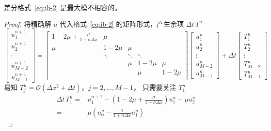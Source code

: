\begin{example}
    差分格式~\eqref{eq:ib-2} 是最大模不相容的。
\end{example}

\begin{proof}
    将精确解 $u$ 代入格式~\eqref{eq:ib-2} 的矩阵形式，产生余项 $\Delta t\, T^n$
    \[
        \begin{bmatrix}
            u_1^{n+1} \\ u_2^{n+1} \\ \vdots \\ u_{M-2}^{n+1} \\ u_{M-1}^{n+1}
        \end{bmatrix}
        =
        \begin{bmatrix}
            1-2\mu + \frac{\mu}{1+\sigma \Delta x} & \mu    &        &        &        \\
            \mu                                    & 1-2\mu & \mu    &        &        \\
                                                   & \ddots & \ddots & \ddots &        \\
                                                   &        & \mu    & 1-2\mu & \mu    \\
                                                   &        &        & \mu    & 1-2\mu \\
        \end{bmatrix}
        \begin{bmatrix}
            u_1^{n} \\ u_2^{n} \\ \vdots \\ u_{M-2}^{n} \\ u_{M-1}^{n}
        \end{bmatrix}
        +
        \Delta t
        \begin{bmatrix}
            T_1^{n} \\ T_2^{n} \\ \vdots \\ T_{M-2}^{n} \\ T_{M-1}^{n}
        \end{bmatrix}
    \]
    易知 $T_j^{n} = \mathcal{O}( \Delta x^2 + \Delta t)$，$j=2,\dots,M-1$，
    只需要关注 $T_1^{n}$
    \begin{align*}
        \Delta t\, T_1^{n} ={} & u_1^{n+1} - \left(1-2\mu + \frac{\mu}{1+\sigma \Delta x}\right) u_1^n - \mu u_2^n \\
        ={}                    & \mu \left(u_0^n - \frac{1}{1+\sigma \Delta x} u_1^n\right)

\end{align*}
\end{proof}
